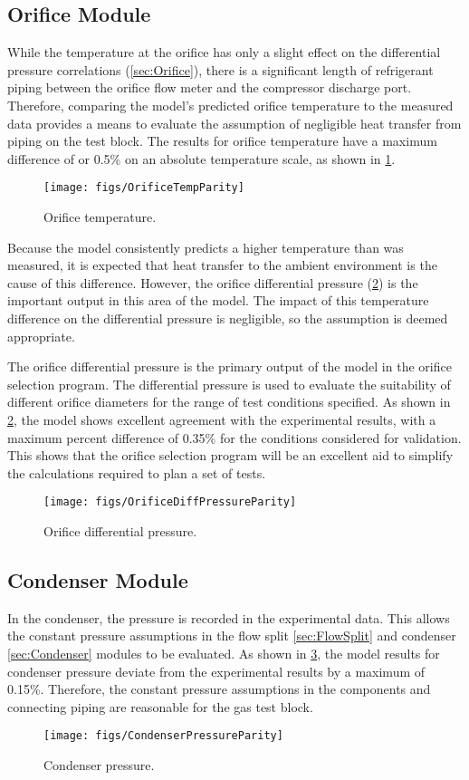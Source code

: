\subsection{Orifice Module} \label{sec:OrifResults}
While the temperature at the orifice has only a slight effect
on the differential pressure correlations (\cref{sec:Orifice}),
there is a significant length of refrigerant piping
between the orifice flow meter and the compressor discharge port.
Therefore, comparing the model's predicted orifice temperature to the 
measured data provides a means to evaluate the assumption
of negligible heat transfer from piping on the test block.
The results for orifice temperature have a maximum
difference of  or 0.5\% on an absolute temperature scale, 
as shown in \cref{fig:OrificeTempParity}.
\begin{figure}[tbp]
  \centering
  \texttt{[image: figs/OrificeTempParity]}
  \caption{Orifice temperature.}
  \label{fig:OrificeTempParity}
\end{figure}
Because the model consistently predicts a higher temperature
than was measured, it is expected that heat transfer to the
ambient environment is the cause of this difference.
However, the orifice differential pressure (\cref{fig:OrificeDiffParity})
is the important output in this area of the model.
The impact of this temperature difference on the differential pressure is negligible,
so the assumption is deemed appropriate.

The orifice differential pressure is the primary output of the model
in the orifice selection program.
The differential pressure is used to evaluate the suitability
of different orifice diameters for the range of test conditions specified.
As shown in \cref{fig:OrificeDiffParity}, the model shows excellent 
agreement with the experimental results, with a maximum percent difference
of 0.35\% for the conditions considered for validation.
This shows that the orifice selection program will be an excellent 
aid to simplify the calculations required to plan a set of tests.
\begin{figure}[tbp]
  \centering
  \texttt{[image: figs/OrificeDiffPressureParity]}
  \caption{Orifice differential pressure.}
  \label{fig:OrificeDiffParity}
\end{figure}

\subsection{Condenser Module} \label{sec:condresult}
In the condenser, the pressure is recorded in the experimental data.
This allows the constant pressure assumptions in the flow split \cref{sec:FlowSplit}
and condenser \cref{sec:Condenser} modules to be evaluated.
As shown in \cref{fig:CondPressParity}, the model results for condenser pressure
deviate from the experimental results by a maximum of 0.15\%.
Therefore, the constant pressure assumptions in the components
and connecting piping are reasonable for the  gas test block.
\begin{figure}[tbp]
  \centering
  \texttt{[image: figs/CondenserPressureParity]}
  \caption{Condenser pressure.}
  \label{fig:CondPressParity}
\end{figure}

